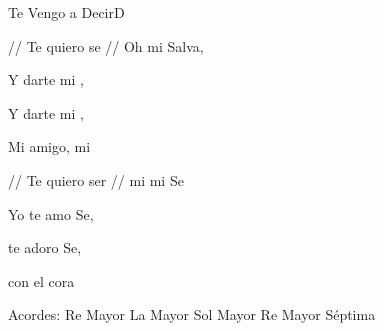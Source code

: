 \documentclass[12pt, spanish]{book}
\begin{document}
\begin{song}{Te Vengo a Decir}{D}
        \begin{SBOpGroup}
            // Te quiero se // Oh mi Salva,

            Y darte mi ,

            Y darte mi ,

            Mi amigo, mi

            // Te quiero ser // mi  mi Se
        \end{SBOpGroup}

        \begin{SBChorus}
            Yo te amo Se,

            te adoro Se,

            con el cora
        \end{SBChorus}

        \ifChordBk
        \begin{SBOpGroup}
            Acordes:
            \upchord{\D}\qquad Re Mayor \hfill
            \upchord{\A}\qquad La Mayor \hfill\null\break
            \upchord{\G}\qquad Sol Mayor \hfill
            \upchord{\Dseven}\qquad Re Mayor S\'eptima \hfill\null\break
        \end{SBOpGroup}
        \fi
    \end{song}
\end{document}

